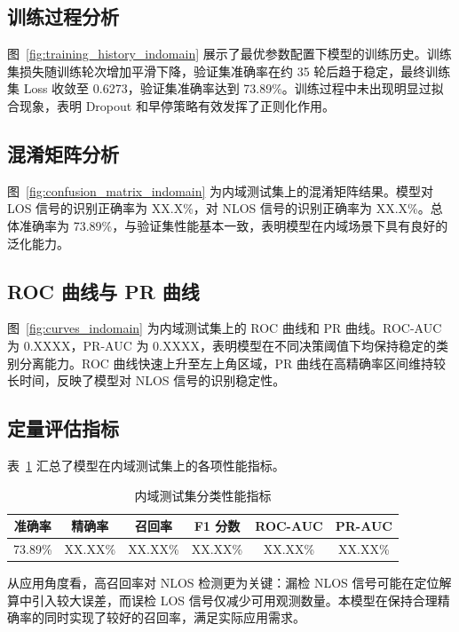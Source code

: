 \subsection{训练过程分析}

图~\ref{fig:training_history_indomain} 展示了最优参数配置下模型的训练历史。训练集损失随训练轮次增加平滑下降，验证集准确率在约 35 轮后趋于稳定，最终训练集 Loss 收敛至 0.6273，验证集准确率达到 73.89\%。训练过程中未出现明显过拟合现象，表明 Dropout 和早停策略有效发挥了正则化作用。

\subsection{混淆矩阵分析}

图~\ref{fig:confusion_matrix_indomain} 为内域测试集上的混淆矩阵结果。模型对 LOS 信号的识别正确率为 XX.X\%，对 NLOS 信号的识别正确率为 XX.X\%。总体准确率为 73.89\%，与验证集性能基本一致，表明模型在内域场景下具有良好的泛化能力。

\subsection{ROC 曲线与 PR 曲线}

图~\ref{fig:curves_indomain} 为内域测试集上的 ROC 曲线和 PR 曲线。ROC-AUC 为 0.XXXX，PR-AUC 为 0.XXXX，表明模型在不同决策阈值下均保持稳定的类别分离能力。ROC 曲线快速上升至左上角区域，PR 曲线在高精确率区间维持较长时间，反映了模型对 NLOS 信号的识别稳定性。

\subsection{定量评估指标}

表~\ref{tab:metrics_indomain} 汇总了模型在内域测试集上的各项性能指标。

\begin{table}[h]
\centering
\caption{内域测试集分类性能指标}
\label{tab:metrics_indomain}
\begin{tabular}{cccccc}
\hline
准确率 & 精确率 & 召回率 & F1 分数 & ROC-AUC & PR-AUC \\
\hline
73.89\% & XX.XX\% & XX.XX\% & XX.XX\% & XX.XX\% & XX.XX\% \\
\hline
\end{tabular}
\end{table}

从应用角度看，高召回率对 NLOS 检测更为关键：漏检 NLOS 信号可能在定位解算中引入较大误差，而误检 LOS 信号仅减少可用观测数量。本模型在保持合理精确率的同时实现了较好的召回率，满足实际应用需求。

